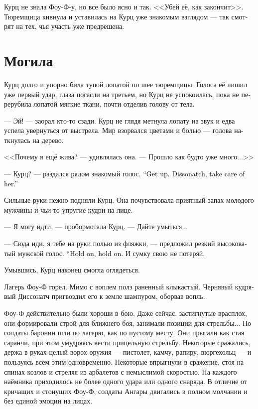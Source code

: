 \documentclass[a4paper,12pt,fleqn]{book}\usepackage{cooltooltips}\usepackage{polyglossia}\setdefaultlanguage[babelshorthands=true]{russian}\setotherlanguage{english}\defaultfontfeatures{Ligatures=TeX,Mapping=tex-text} \usepackage{xcolor}\definecolor{lightgray}{HTML}{bbbbbb}\color{lightgray}\newcommand{\ml}[3]{\textenglish{\textcolor{black}{#3}}}
\begin{document}
Курц не знала Фоу-Ф-у, но все было ясно и так.
<<Убей её, как закончит>>.
Тюремщица кивнула и уставилась на Курц уже знакомым взглядом --- так смотрят на тех, чья участь уже предрешена.

\section{Могила}

Курц долго и упорно била тупой лопатой по шее тюремщицы.
Голоса её лишил уже первый удар, глаза погасли на третьем, но Курц не успокоилась, пока не перерубила лопатой мягкие ткани, почти отделив голову от тела.

--- Эй! --- заорал кто-то сзади.
Курц не глядя метнула лопату на звук и едва успела увернуться от выстрела.
Мир взорвался цветами и болью --- голова наткнулась на дерево.

<<Почему я ещё жива? --- удивлялась она.
--- Прошло как будто уже много...>>

--- Курц? --- раздался рядом знакомый голос.
\ml{$0$}
{--- Вставай.}
{``Get up.}
\ml{$0$}
{Диссонатч, подержи её.}
{Dissonatch, take care of her.''}

Сильные руки нежно подняли Курц.
Она почувствовала приятный запах молодого мужчины и чьи-то упругие кудри на лице.

--- Я могу идти, --- пробормотала Курц.
--- Дайте умыться...

--- Сюда иди, я тебе на руки полью из фляжки, --- предложил резкий высоковатый мужской голос.
\ml{$0$}
{--- Держись, держись.}
{``Hold on, hold on.}
И сумку свою не потеряй.

Умывшись, Курц наконец смогла оглядеться.

Лагерь Фоу-Ф горел.
Мимо с воплем полз раненный клыкастый.
Чернявый кудрявый Диссонатч пригвоздил его к земле шампуром, оборвав вопль.

Фоу-Ф действительно были хороши в бою.
Даже сейчас, застигнутые врасплох, они формировали строй для ближнего боя, занимали позиции для стрельбы...
Но солдаты баронин шли по лагерю, как по пустому месту.
Они прыгали как стая саранчи, при этом умудряясь вести прицельную стрельбу.
Некоторые сражались, держа в руках целый ворох оружия --- пистолет, камчу, рапиру, вюргехольц --- и пользуясь всем этим одновременно.
Некоторые впрыгнули в сражение, стоя на спинах козлов и стреляя из арбалетов с немыслимой скоростью.
На каждого наёмника приходилось не более одного удара или одного снаряда.
В отличие от кричащих и стонущих Фоу-Ф, солдаты Ангары двигались в полном молчании и без единой эмоции на лицах.
\end{document}
